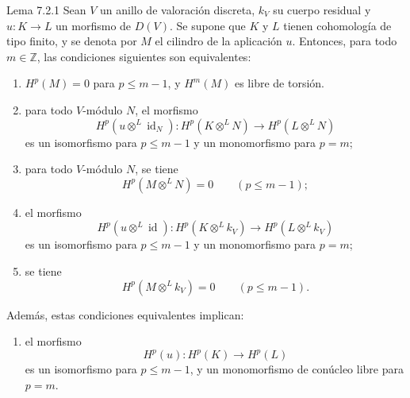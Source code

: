\begin{statement}{Lema 7.2.1}
Sean $V$ un anillo de valoración discreta, $k_V$ su cuerpo residual y $u:K\to L$ un morfismo de $D(V)$. Se supone que $K$ y $L$ tienen cohomología de tipo finito, y se denota por $M$ el cilindro de la aplicación $u$. Entonces, para todo $m\in\mathbb Z$, las condiciones siguientes son equivalentes:
\begin{enumerate}[label=(\roman*)]
\item $H^p(M)=0$ para $p\le m-1$, y $H^m(M)$ es libre de torsión.
\item para todo $V$-módulo $N$, el morfismo
\[
H^p(u\otimes^L\operatorname{id}_N):H^p(K\otimes^L N)\to H^p(L\otimes^L N)
\]
es un isomorfismo para $p\le m-1$ y un monomorfismo para $p=m$;
\item[(ii bis)] para todo $V$-módulo $N$, se tiene
\[
H^p(M\otimes^L N)=0\qquad(p\le m-1);
\]
\item el morfismo
\[
H^p(u\otimes^L\operatorname{id}):H^p(K\otimes^L k_V)\to H^p(L\otimes^L k_V)
\]
es un isomorfismo para $p\le m-1$ y un monomorfismo para $p=m$;
\item[(iii bis)] se tiene
\[
H^p(M\otimes^L k_V)=0\qquad(p\le m-1).
\]
\end{enumerate}
Además, estas condiciones equivalentes implican:
\begin{enumerate}[label=(\roman* bis)]
\item el morfismo
\[
H^p(u):H^p(K)\to H^p(L)
\]
es un isomorfismo para $p\le m-1$, y un monomorfismo de conúcleo libre para $p=m$.
\end{enumerate}
\end{statement}
